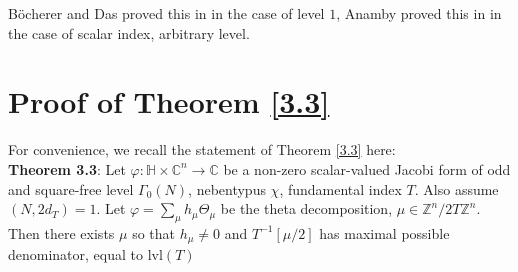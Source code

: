 \documentclass[11pt]{article}
\theoremstyle{definition}
\theoremstyle{remark}
\newcommand{\C}{\mathbb{C}}
\begin{document}
B\"ocherer and Das proved this in \cite{BD} in the case of level $1$, Anamby proved this in \cite{anamby} in the case of scalar index, arbitrary level. 

\section{Proof of Theorem \ref{3.3}} \label{Theorem 3.3 proof}
    
For convenience, we recall the statement of Theorem \ref{3.3} here: \\

{\bf Theorem 3.3}: Let $\varphi:\mathbb{H} \times \C^n \to \mathbb{C}$ be a non-zero scalar-valued Jacobi form of odd and square-free level $\Gamma_0(N)$, nebentypus $\chi$, fundamental index $T$. Also assume $(N,2d_T) = 1$. Let $\varphi = \sum_\mu h_\mu \Theta_\mu$ be the theta decomposition, $\mu \in \mathbb{Z}^{n}/2T\mathbb{Z}^n$. Then there exists $\mu$ so that $h_\mu \neq 0$ and $T^{-1}[\mu/2]$ has maximal possible denominator, equal to $\mathrm{lvl}(T)$ \\
\end{document}
